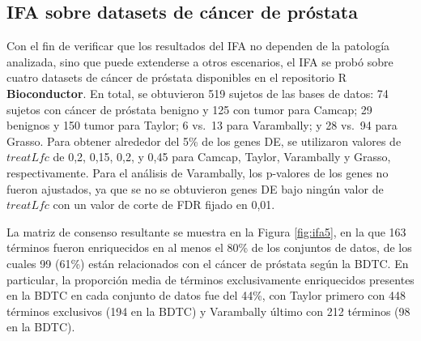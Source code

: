 \documentclass[12pt,twoside]{reedthesis}
\begin{document}
\hypertarget{ifa-sobre-datasets-de-cancer-de-prostata}{%
\subsection{IFA sobre datasets de cáncer de próstata}\label{ifa-sobre-datasets-de-cancer-de-prostata}}

\par

Con el fin de verificar que los resultados del IFA no dependen de la patología analizada, sino que puede extenderse a otros escenarios, el IFA se probó sobre cuatro datasets de cáncer de próstata disponibles en el repositorio R \textbf{Bioconductor}. En total, se obtuvieron 519 sujetos de las bases de datos: 74 sujetos con cáncer de próstata benigno y 125 con tumor para Camcap; 29 benignos y 150 tumor para Taylor; 6 vs.~13 para Varambally; y 28 vs.~94 para Grasso. Para obtener alrededor del 5\% de los genes DE, se utilizaron valores de \(treatLfc\) de 0,2, 0,15, 0,2, y 0,45 para Camcap, Taylor, Varambally y Grasso, respectivamente. Para el análisis de Varambally, los p-valores de los genes no fueron ajustados, ya que se no se obtuvieron genes DE bajo ningún valor de \(treatLfc\) con un valor de corte de FDR fijado en 0,01.

\par

La matriz de consenso resultante se muestra en la Figura \ref{fig:ifa5}, en la que 163 términos fueron enriquecidos en al menos el 80\% de los conjuntos de datos, de los cuales 99 (61\%) están relacionados con el cáncer de próstata según la BDTC. En particular, la proporción media de términos exclusivamente enriquecidos presentes en la BDTC en cada conjunto de datos fue del 44\%, con Taylor primero con 448 términos exclusivos (194 en la BDTC) y Varambally último con 212 términos (98 en la BDTC).
\end{document}
